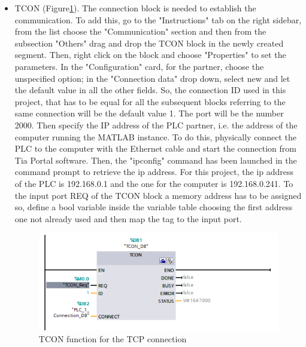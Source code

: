 \begin{itemize}
    \item TCON (Figure\ref{fig:tcon}). The connection block is needed to establish the communication. To add this, go to the "Instructions" tab on the right sidebar, from the list choose the "Communication" section and then from the subsection "Others" drag and drop the TCON block in the newly created segment. Then, right click on the block and choose "Properties" to set the parameters. In the "Configuration" card, for the partner, choose the unspecified option; in the "Connection data" drop down, select new and let the default value in all the other fields. So, the connection ID used in this project, that has to be equal for all the subsequent blocks referring to the same connection will be the default value 1. The port will be the number 2000. Then specify the IP address of the PLC partner, i.e. the address of the computer running the MATLAB instance. To do this, physically connect the PLC to the computer with the Ethernet cable and start the connection from Tia Portal software. Then, the "ipconfig" command has been launched in the command prompt to retrieve the ip address. For this project, the ip address of the PLC is 192.168.0.1 and the one for the computer is 192.168.0.241. To the input port REQ of the TCON block a memory address has to be assigned so, define a bool variable inside the variable table choosing the first address one not already used and then map the tag to the input port. 
    
    \begin{figure}[!h]
    \begin{center}
    \includegraphics[width=0.8\linewidth]{capitolo3/figure/tcon.PNG}
    \caption{TCON function for the TCP connection}
     \label{fig:tcon}
    \end{center}
    \end{figure}
    

\end{itemize}
